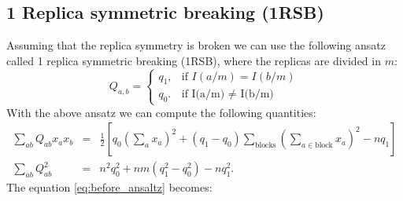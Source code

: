 \documentclass{article}
\begin{document}
\subsection{1 Replica symmetric breaking (1RSB)}
Assuming that the replica symmetry is broken we can use the following ansatz called 1 replica symmetric breaking (1RSB), where the replicas are divided in $m$:
$$
Q_{a,b}=\begin{cases}
			q_1, & \text{if $I(a/m)=I(b/m)$}\\
            q_0. & \text{if I(a/m) $\neq$ I(b/m)}
		 \end{cases}
$$
With the above ansatz we can compute the following quantities:
\begin{eqnarray}
\sum_{ab} Q_{ab} x_{a} x_{b} &=& \frac{1}{2} \left[ q_0 \left( \sum_{a}x_a\right)^2 + (q_1-q_0) \sum_{\text{blocks}} \left( \sum_{a \in \text{block}}x_a\right)^2  -nq_1\right] \\
\sum_{ab} Q_{ab}^2 &=&  n^2 q_0^2 + nm(q_1^2 - q_0^2) -n q_1^2.
\end{eqnarray}
The equation \ref{eq:before_ansaltz} becomes:
\end{document}
